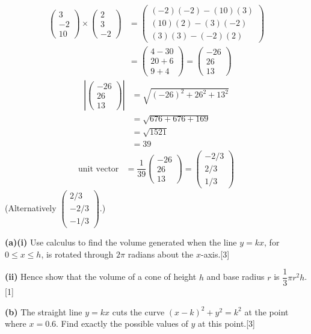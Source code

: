 \documentclass[a4paper,11pt,oneside]{article}
\newcommand{\Qhead}[1]{\par\needspace{14\baselineskip}\medskip\noindent{\large\bfseries #1}\par\smallskip}
\newcommand{\partlabel}[1]{\par\needspace{3\baselineskip}\smallskip\noindent\textbf{#1}\quad}
\newcommand{\mk}[1]{\hfill[#1]}
\begin{document}
\begin{solbox}
\begin{align*}
\begin{pmatrix}3\\-2\\10\end{pmatrix}\times\begin{pmatrix}2\\3\\-2\end{pmatrix}
&= \begin{pmatrix}
(-2)(-2)-(10)(3)\\[0.4ex]
(10)(2)-(3)(-2)\\[0.4ex]
(3)(3)-(-2)(2)
\end{pmatrix}\\
&= \begin{pmatrix}4-30\\[0.4ex]20+6\\[0.4ex]9+4\end{pmatrix}
= \begin{pmatrix}-26\\26\\13\end{pmatrix}
\end{align*}
\begin{align*}
\left|\begin{pmatrix}-26\\26\\13\end{pmatrix}\right|
&= \sqrt{(-26)^2 + 26^2 + 13^2}\\
&= \sqrt{676 + 676 + 169}\\
&= \sqrt{1521}\\
&= 39
\end{align*}
\begin{align*}
\text{unit vector}
&= \dfrac{1}{39}\begin{pmatrix}-26\\26\\13\end{pmatrix}
= \begin{pmatrix}-2/3\\[0.3ex]2/3\\[0.3ex]1/3\end{pmatrix}
\end{align*}
(Alternatively $\begin{pmatrix}2/3\\[0.3ex]-2/3\\[0.3ex]-1/3\end{pmatrix}$.)
\end{solbox}
\clearpage
\Qhead{2}
\partlabel{(a)(i)}
Use calculus to find the volume generated when the line $y=kx$, for $0\le x\le h$, is rotated through $2\pi$ radians about the $x$-axis.\mk{3}
\partlabel{(ii)}
Hence show that the volume of a cone of height $h$ and base radius $r$ is $\dfrac{1}{3}\pi r^2h$.\mk{1}
\partlabel{(b)}
The straight line $y=kx$ cuts the curve $(x-k)^2+y^2=k^2$ at the point where $x=0.6$. Find exactly the possible values of $y$ at this point.\mk{3}
\end{document}
